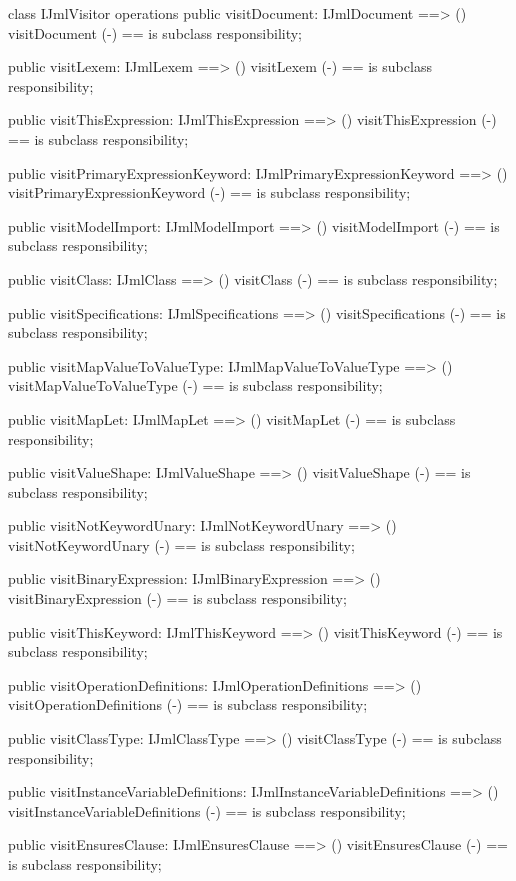 \begin{vdm_al}
class IJmlVisitor
operations
  public visitDocument: IJmlDocument ==> ()
  visitDocument (-) == is subclass responsibility;

  public visitLexem: IJmlLexem ==> ()
  visitLexem (-) == is subclass responsibility;

  public visitThisExpression: IJmlThisExpression ==> ()
  visitThisExpression (-) == is subclass responsibility;

  public visitPrimaryExpressionKeyword: IJmlPrimaryExpressionKeyword ==> ()
  visitPrimaryExpressionKeyword (-) == is subclass responsibility;

  public visitModelImport: IJmlModelImport ==> ()
  visitModelImport (-) == is subclass responsibility;

  public visitClass: IJmlClass ==> ()
  visitClass (-) == is subclass responsibility;

  public visitSpecifications: IJmlSpecifications ==> ()
  visitSpecifications (-) == is subclass responsibility;

  public visitMapValueToValueType: IJmlMapValueToValueType ==> ()
  visitMapValueToValueType (-) == is subclass responsibility;

  public visitMapLet: IJmlMapLet ==> ()
  visitMapLet (-) == is subclass responsibility;

  public visitValueShape: IJmlValueShape ==> ()
  visitValueShape (-) == is subclass responsibility;

  public visitNotKeywordUnary: IJmlNotKeywordUnary ==> ()
  visitNotKeywordUnary (-) == is subclass responsibility;

  public visitBinaryExpression: IJmlBinaryExpression ==> ()
  visitBinaryExpression (-) == is subclass responsibility;

  public visitThisKeyword: IJmlThisKeyword ==> ()
  visitThisKeyword (-) == is subclass responsibility;

  public visitOperationDefinitions: IJmlOperationDefinitions ==> ()
  visitOperationDefinitions (-) == is subclass responsibility;

  public visitClassType: IJmlClassType ==> ()
  visitClassType (-) == is subclass responsibility;

  public visitInstanceVariableDefinitions: IJmlInstanceVariableDefinitions ==> ()
  visitInstanceVariableDefinitions (-) == is subclass responsibility;

  public visitEnsuresClause: IJmlEnsuresClause ==> ()
  visitEnsuresClause (-) == is subclass responsibility;


\end{vdm_al}
